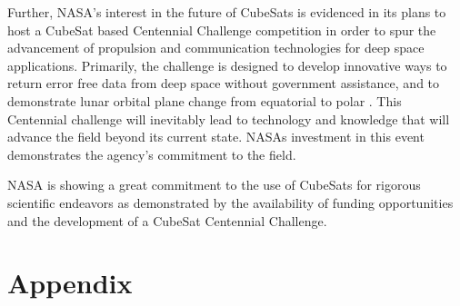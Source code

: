 \documentclass[11pt]{article}
\begin{document}
Further, NASA’s interest in the future of CubeSats is evidenced in its plans to host a CubeSat based Centennial Challenge competition in order to spur the advancement of propulsion and communication technologies for deep space applications. Primarily, the challenge is designed to develop innovative ways to return error free data from deep space without government assistance, and to demonstrate lunar orbital plane change from equatorial to polar \cite{solicitation}. This Centennial challenge will inevitably lead to technology and knowledge that will advance the field beyond its current state. NASAs investment in this event demonstrates the agency’s commitment to the field. 

NASA is showing a great commitment to the use of CubeSats for rigorous scientific endeavors as demonstrated by the availability of funding opportunities and the development of a CubeSat Centennial Challenge. 

\newpage
\section{Appendix}
\end{document}
